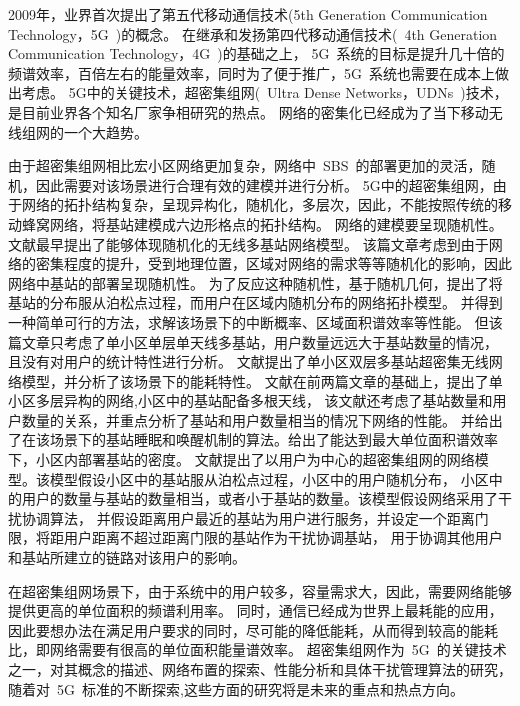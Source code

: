 
2009年，业界首次提出了第五代移动通信技术(5th Generation Communication Technology，5G~)的概念。
在继承和发扬第四代移动通信技术(~4th Generation Communication Technology，4G~)的基础之上，
5G~系统的目标是提升几十倍的频谱效率，百倍左右的能量效率，同时为了便于推广，5G~系统也需要在成本上做出考虑。
5G中的关键技术，超密集组网(~Ultra Dense Networks，UDNs~)技术，
是目前业界各个知名厂家争相研究的热点。
网络的密集化已经成为了当下移动无线组网的一个大趋势。

由于超密集组网相比宏小区网络更加复杂，网络中~SBS~的部署更加的灵活，随机，因此需要对该场景进行合理有效的建模并进行分析。
5G中的超密集组网，由于网络的拓扑结构复杂，呈现异构化，随机化，多层次，因此，不能按照传统的移动蜂窝网络，将基站建模成六边形格点的拓扑结构。
网络的建模要呈现随机性。文献\cite{ATractable}最早提出了能够体现随机化的无线多基站网络模型。
该篇文章考虑到由于网络的密集程度的提升，受到地理位置，区域对网络的需求等等随机化的影响，因此网络中基站的部署呈现随机性。
为了反应这种随机性，基于随机几何，提出了将基站的分布服从泊松点过程，而用户在区域内随机分布的网络拓扑模型。
并得到一种简单可行的方法，求解该场景下的中断概率、区域面积谱效率等性能。
但该篇文章只考虑了单小区单层单天线多基站，用户数量远远大于基站数量的情况，
且没有对用户的统计特性进行分析。
文献\cite{2LayerPC}提出了单小区双层多基站超密集无线网络模型，并分析了该场景下的能耗特性。
文献\cite{UDNMIMO}在前两篇文章的基础上，提出了单小区多层异构的网络,小区中的基站配备多根天线，
该文献还考虑了基站数量和用户数量的关系，并重点分析了基站和用户数量相当的情况下网络的性能。
并给出了在该场景下的基站睡眠和唤醒机制的算法。给出了能达到最大单位面积谱效率下，小区内部署基站的密度。
文献\cite{user-centric}提出了以用户为中心的超密集组网的网络模型。该模型假设小区中的基站服从泊松点过程，小区中的用户随机分布，
小区中的用户的数量与基站的数量相当，或者小于基站的数量。该模型假设网络采用了干扰协调算法，
并假设距离用户最近的基站为用户进行服务，并设定一个距离门限，将距用户距离不超过距离门限的基站作为干扰协调基站，
用于协调其他用户和基站所建立的链路对该用户的影响。

在超密集组网场景下，由于系统中的用户较多，容量需求大，因此，需要网络能够提供更高的单位面积的频谱利用率。
同时，通信已经成为世界上最耗能的应用，因此要想办法在满足用户要求的同时，尽可能的降低能耗，从而得到较高的能耗比，即网络需要有很高的单位面积能量谱效率。
超密集组网作为~5G~的关键技术之一，对其概念的描述、网络布置的探索、性能分析和具体干扰管理算法的研究，
随着对~5G~标准的不断探索,这些方面的研究将是未来的重点和热点方向。

